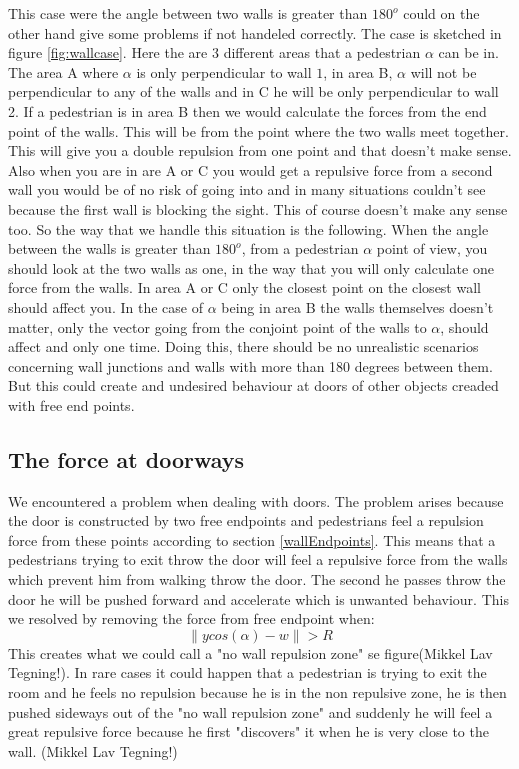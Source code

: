 This case were the angle between two walls is greater than $180^o$ could on the other hand give some problems if not handeled correctly. The case is sketched in figure \ref{fig:wallcase}. Here the are 3 different areas that a pedestrian $\alpha$ can be in. The area A where $\alpha$ is only perpendicular to wall $1$, in area B, $\alpha$ will not be perpendicular to any of the walls and in C he will be only perpendicular to wall 2. If a pedestrian is in area B then we would calculate the forces from the end point of the walls. This will be from the point where the two walls meet together. This will give you a double repulsion from one point and that doesn't make sense. Also when you are in are A or C you would get a repulsive force from a second wall you would be of no risk of going into and in many situations couldn't see because the first wall is blocking the sight. This of course doesn't make any sense too. So the way that we handle this situation is the following. When the angle between the walls is greater than $180^o$, from a pedestrian $\alpha$ point of view, you should look at the two walls as one, in the way that you will only calculate one force from the walls. In area A or C only the closest point on the closest wall should affect you. In the case of $\alpha$ being in area B the walls themselves doesn't matter, only the vector going from the conjoint point of the walls to $\alpha$, should affect and only one time. Doing this, there should be no unrealistic scenarios concerning wall junctions and walls with more than 180 degrees between them. But this could create and undesired behaviour at doors of other objects creaded with free end points.
\subsection{The force at doorways}
We encountered a problem when dealing with doors. The problem arises because the door is constructed by two free endpoints and pedestrians feel a repulsion force from these points according to section \ref{wallEndpoints}. This means that a pedestrians trying to exit throw the door will feel a repulsive force from the walls which prevent him from walking throw the door. The second he passes throw the door he will be pushed forward and accelerate which is unwanted behaviour. This we resolved by removing the force from free endpoint when:
\begin{equation}
\| y cos(\alpha) - w \| > R
\end{equation}
This creates what we could call a "no wall repulsion zone" se figure(Mikkel Lav Tegning!).
In rare cases it could happen that a pedestrian is trying to exit the room and he feels no repulsion because he is in the non repulsive zone, he is then pushed sideways out of the "no wall repulsion zone" and suddenly he will feel a great repulsive force because he first "discovers" it when he is very close to the wall.
(Mikkel Lav Tegning!)

